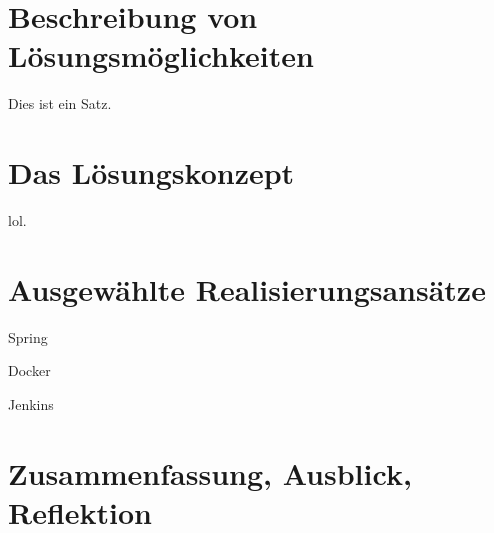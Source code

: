 \documentclass[a4paper, 11pt]{article}
\begin{document}
\newpage
\section{Beschreibung von Lösungsmöglichkeiten}

Dies ist ein Satz.

\newpage
\section{Das Lösungskonzept}

lol.

\newpage
\section{Ausgewählte Realisierungsansätze}

Spring

Docker

Jenkins

\newpage
\section{Zusammenfassung, Ausblick, Reflektion}

\end{document}
